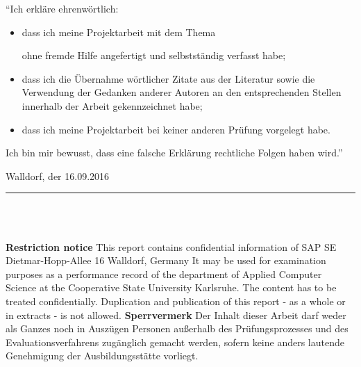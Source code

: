 \begin{spacing}{1.0}
``Ich erkl{\"a}re ehrenw{\"o}rtlich: \newline
\begin{itemize}

\item[1.] dass ich meine Projektarbeit mit dem Thema 
\begin{quote}
\textit{\titel} 
\end{quote} 
ohne fremde Hilfe angefertigt und selbstst{\"a}ndig verfasst habe;
\item[2.] dass ich die {\"U}bernahme w{\"o}rtlicher Zitate aus der Literatur
sowie die Verwendung der Gedanken anderer Autoren an den entsprechenden Stellen innerhalb der Arbeit gekennzeichnet
habe;
\item[3.] dass ich meine Projektarbeit bei keiner anderen Pr{\"u}fung vorgelegt
habe.
\end{itemize}

Ich bin mir bewusst, dass eine falsche Erkl{\"a}rung rechtliche Folgen haben wird.''
\newline

Walldorf, der 16.09.2016 \\[4ex]

\rule[-0.2cm]{5cm}{0.5pt} \\

\textsc{\autor} \\[10ex]
\end{spacing}

\newpage 

{\bfseries Restriction notice} \newline
This report contains confidential information of \newline
SAP SE \newline
Dietmar-Hopp-Allee 16  Walldorf, Germany \newline
It may be used for examination purposes as a performance record of the department
of Applied Computer Science at the Cooperative State University Karlsruhe.
The content has to be treated confidentially. \newline
Duplication and publication of this report - as a whole or in extracts - is not
allowed. \newline
\vskip 1cm
\textbf{Sperrvermerk} \newline
Der Inhalt dieser Arbeit darf weder als Ganzes noch in Ausz{\"u}gen Personen 
au{\ss}erhalb des Pr{\"u}fungsprozesses und des Evaluationsverfahrens
zug{\"a}nglich gemacht werden, sofern keine anders lautende Genehmigung der Ausbildungsst{\"a}tte vorliegt.